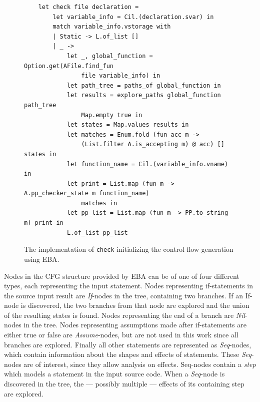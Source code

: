 \begin{figure}[H]
    \centering
    \begin{verbatim}
    let check file declaration =
        let variable_info = Cil.(declaration.svar) in
        match variable_info.vstorage with 
        | Static -> L.of_list []
        | _ ->
            let _, global_function = Option.get(AFile.find_fun 
                file variable_info) in
            let path_tree = paths_of global_function in
            let results = explore_paths global_function path_tree 
                Map.empty true in 
            let states = Map.values results in
            let matches = Enum.fold (fun acc m -> 
                (List.filter A.is_accepting m) @ acc) [] states in
            let function_name = Cil.(variable_info.vname) in 
            let print = List.map (fun m -> A.pp_checker_state m function_name) 
                matches in
            let pp_list = List.map (fun m -> PP.to_string m) print in
            L.of_list pp_list
    \end{verbatim}
    \caption{The implementation of \texttt{check} initializing the control flow generation using EBA.}
    \label{check-implementation}
\end{figure}

\newpar Nodes in the CFG structure provided by EBA can be of one of four different types, each representing the input statement. Nodes representing if-statements in the source input result are \textit{If}-nodes in the tree, containing two branches. If an If-node is discovered, the two branches from that node are explored and the union of the resulting states is found. Nodes representing the end of a branch are \textit{Nil}-nodes in the tree. Nodes representing assumptions made after if-statements are either true or false are \textit{Assume}-nodes, but are not used in this work since all branches are explored. Finally all other statements are represented as \textit{Seq}-nodes, which contain information about the shapes and effects of statements. These \textit{Seq}-nodes are of interest, since they allow analysis on effects. Seq-nodes contain a \textit{step} which models a statement in the input source code. When a \textit{Seq}-node is discovered in the tree, the --- possibly multiple --- effects of its containing step are explored. 


